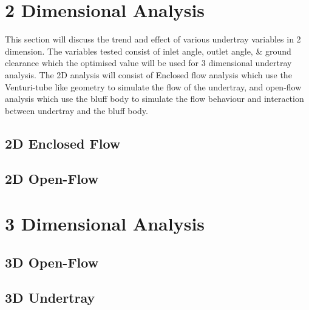 \newpage
\section{2 Dimensional Analysis}
This section will discuss the trend and effect of various undertray variables in 2 dimension. The variables tested consist of inlet angle, outlet angle, \& ground clearance which the optimised value will be used for 3 dimensional undertray analysis. The 2D analysis will consist of Enclosed flow analysis which use the Venturi-tube like geometry to simulate the flow of the undertray, and open-flow analysis which use the bluff body to simulate the flow behaviour and interaction between undertray and the bluff body. 

\subsection{2D Enclosed Flow}
\subsection{2D Open-Flow}

\section{3 Dimensional Analysis}

\subsection{3D Open-Flow}
\subsection{3D Undertray}